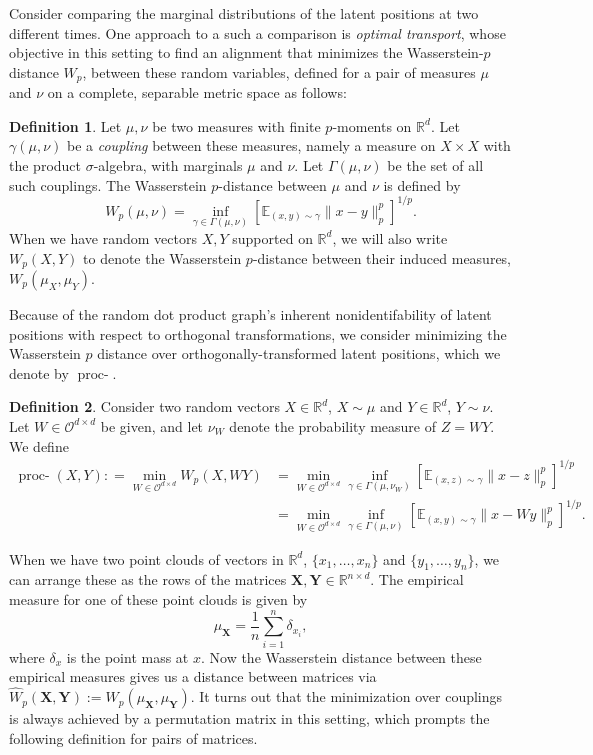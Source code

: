 \documentclass[12pt]{article}
\newcommand{\RR}{\mathbb{R}}
\newcommand{\EE}{\mathbb{E}}
\theoremstyle{definition}
\newtheorem{definition}{Definition}
\newcommand{\bX}{\mathbf{X}}
\newcommand{\bY}{\mathbf{Y}}
\newcommand{\procwp}[1][2]{\mathop{\mbox{proc-$W_#1$}}}
\begin{document}
Consider comparing the marginal distributions of the latent positions at two different times. One approach to a such a comparison is \emph{optimal transport}, whose objective in this setting to find an alignment that minimizes the Wasserstein-$p$ distance $W_p$, between these random variables, defined for a pair of measures $\mu$ and $\nu$ on a complete, separable metric space as follows:

\begin{definition}\label{def:Wasserstein_distance_measures}
Let $\mu, \nu$ be two measures with finite $p$-moments on $\RR^d$. Let $\gamma(\mu, \nu)$ be a \emph{coupling} between these measures, namely a measure on $X\times X$ with the product $\sigma$-algebra, with marginals $\mu$ and $\nu$. Let $\Gamma(\mu, \nu)$ be the set of all such couplings.  The Wasserstein $p$-distance between $\mu$ and $\nu$ is defined by
$$W_p(\mu, \nu)=\inf_{\gamma \in \Gamma(\mu, \nu)
} \left[\mathbb{E}_{(x,y) \sim \gamma} \|x-y\|_p^p\right]^{1/p}.$$ When we have random vectors $X,Y$ supported on $\RR^d$, we will also write $W_p(X,Y)$ to denote the Wasserstein $p$-distance between their induced measures, $W_p(\mu_X,\mu_Y)$.
\end{definition}

Because of the random dot product graph's inherent nonidentifability of latent positions with respect to orthogonal transformations, we consider minimizing the Wasserstein $p$ distance over orthogonally-transformed latent positions, which we denote by $\procwp[p]$. 

\begin{definition}\label{def:procwp-distance}
Consider two random vectors $X \in \RR^d$, $X \sim \mu$ and $Y\in \RR^d$, $Y \sim \nu$. Let $W \in \mathcal{O}^{d \times d}$ be given, and let $\nu_{W}$ denote the probability measure of $Z=WY$. We define 
\begin{align*}
\procwp[p] (X,Y) : = \min_{W \in \mathcal{O}^{d\times d} } W_p(X,WY) &= \min_{W\in\mathcal{O}^{d\times d}} \inf_{\gamma\in\Gamma(\mu,\nu_W)}[\EE_{(x,z)\sim\gamma}\|x-z
\|_p^p]^{1/p}\\
&= \min_{W\in\mathcal{O}^{d\times d}}\inf_{\gamma\in\Gamma(\mu,\nu)}[\EE_{(x,y)\sim\gamma}\|x-Wy\|_p^p]^{1/p}.
\end{align*}
\end{definition}

When we have two point clouds of vectors in $\RR^d$, $\{x_1,\ldots,x_n\}$ and $\{y_1,\ldots,y_n\}$, we can arrange these as the rows of the matrices $\bX,\bY\in\RR^{n\times d}$. The empirical measure for one of these point clouds is given by $$\mu_{\bX}=\frac{1}{n}\sum_{i=1}^n \delta_{x_i},$$ where $\delta_x$ is the point mass at $x$. Now the Wasserstein distance between these empirical measures gives us a distance between matrices via 
$\hat{W}_p(\bX,\bY):= W_p(\mu_\bX,\mu_\bY).$ It turns out that the minimization over couplings is always achieved by a permutation matrix in this setting, which prompts the following definition for pairs of matrices.
\end{document}
